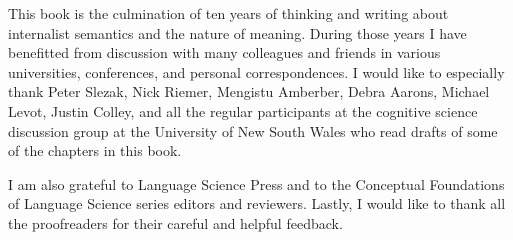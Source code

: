 \begin{refsection}
This book is the culmination of ten years of thinking and writing about internalist semantics and the nature of meaning. During those years I have benefitted from discussion with many colleagues and friends in various universities, conferences, and personal correspondences. I would like to especially thank Peter Slezak, Nick Riemer, Mengistu Amberber, Debra Aarons, Michael Levot, Justin Colley, and all the regular participants at the cognitive science discussion group at the University of New South Wales who read drafts of some of the chapters in this book.

I am also grateful to Language Science Press and to the Conceptual Foundations of Language Science series editors and reviewers. Lastly, I would like to thank all the proofreaders for their careful and helpful feedback.

\end{refsection}